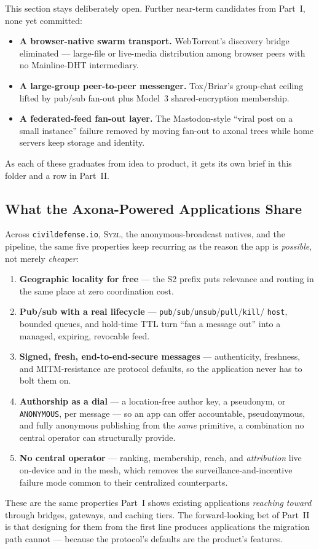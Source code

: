 \documentclass[nobib]{tufte-handout}
\begin{document}
This section stays deliberately open. Further near-term candidates from
Part~I, none yet committed:

\begin{itemize}
\item \textbf{A browser-native swarm transport.} WebTorrent's
discovery bridge eliminated --- large-file or live-media distribution
among browser peers with no Mainline-DHT intermediary.
\item \textbf{A large-group peer-to-peer messenger.} Tox/Briar's
group-chat ceiling lifted by pub/sub fan-out plus Model~3
shared-encryption membership.
\item \textbf{A federated-feed fan-out layer.} The Mastodon-style
``viral post on a small instance'' failure removed by moving fan-out to
axonal trees while home servers keep storage and identity.
\end{itemize}

As each of these graduates from idea to product, it gets its own brief
in this folder and a row in Part~II.

\subsection{What the Axona-Powered Applications Share}

Across \texttt{civildefense.io}, \textsc{Syzl}, the anonymous-broadcast
natives, and the pipeline, the same five properties keep recurring as the
reason the app is \emph{possible}, not merely \emph{cheaper}:

\begin{enumerate}
\item \textbf{Geographic locality for free} --- the S2 prefix puts
relevance and routing in the same place at zero coordination cost.
\item \textbf{Pub/sub with a real lifecycle} ---
\texttt{pub}/\texttt{sub}/\texttt{unsub}/\texttt{pull}/\texttt{kill}/%
\texttt{host}, bounded queues, and hold-time TTL turn ``fan a message
out'' into a managed, expiring, revocable feed.
\item \textbf{Signed, fresh, end-to-end-secure messages} ---
authenticity, freshness, and MITM-resistance are protocol defaults, so
the application never has to bolt them on.
\item \textbf{Authorship as a dial} --- a location-free author key, a
pseudonym, or \texttt{ANONYMOUS}, per message --- so an app can offer
accountable, pseudonymous, and fully anonymous publishing from the
\emph{same} primitive, a combination no central operator can
structurally provide.
\item \textbf{No central operator} --- ranking, membership, reach, and
\emph{attribution} live on-device and in the mesh, which removes the
surveillance-and-incentive failure mode common to their centralized
counterparts.
\end{enumerate}

These are the same properties Part~I shows existing applications
\emph{reaching toward} through bridges, gateways, and caching tiers. The
forward-looking bet of Part~II is that designing for them from the first
line produces applications the migration path cannot --- because the
protocol's defaults are the product's features.
\end{document}
